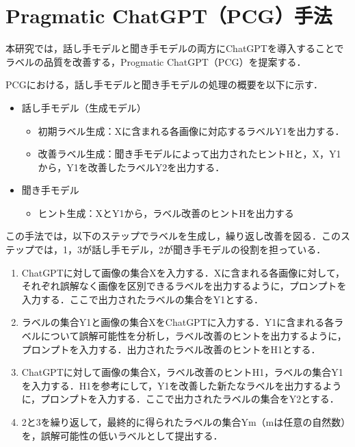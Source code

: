 \documentclass[a4paper,11pt]{jreport}
\begin{document}
\section{Pragmatic ChatGPT（PCG）手法}
本研究では，話し手モデルと聞き手モデルの両方にChatGPTを導入することでラベルの品質を改善する，Progmatic ChatGPT（PCG）を提案する．

PCGにおける，話し手モデルと聞き手モデルの処理の概要を以下に示す．

\begin{itemize}
  \item 話し手モデル（生成モデル）
    \begin{itemize}
      \item 初期ラベル生成：Xに含まれる各画像に対応するラベルY1を出力する．
      \item 改善ラベル生成：聞き手モデルによって出力されたヒントHと，X，Y1から，Y1を改善したラベルY2を出力する．
    \end{itemize}
  \item 聞き手モデル
    \begin{itemize}
      \item ヒント生成：XとY1から，ラベル改善のヒントHを出力する
    \end{itemize}
\end{itemize}

この手法では，以下のステップでラベルを生成し，繰り返し改善を図る．このステップでは，1，3が話し手モデル，2が聞き手モデルの役割を担っている．

\begin{enumerate}
  \item ChatGPTに対して画像の集合Xを入力する．Xに含まれる各画像に対して，それぞれ誤解なく画像を区別できるラベルを出力するように，プロンプトを入力する．ここで出力されたラベルの集合をY1とする．
  \item ラベルの集合Y1と画像の集合XをChatGPTに入力する．Y1に含まれる各ラベルについて誤解可能性を分析し，ラベル改善のヒントを出力するように，プロンプトを入力する．出力されたラベル改善のヒントをH1とする．
  \item ChatGPTに対して画像の集合X，ラベル改善のヒントH1，ラベルの集合Y1を入力する．H1を参考にして，Y1を改善した新たなラベルを出力するように，プロンプトを入力する．ここで出力されたラベルの集合をY2とする．
  \item 2と3を繰り返して，最終的に得られたラベルの集合Ym（mは任意の自然数）を，誤解可能性の低いラベルとして提出する．
\end{enumerate}
\end{document}
